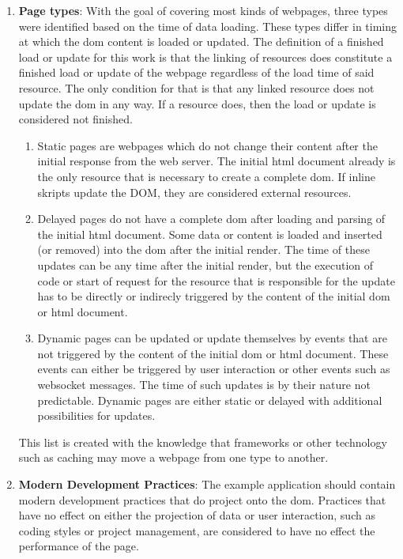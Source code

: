 \documentclass[a4paper, 10pt]{article}
\begin{document}
\begin{enumerate}
  \item \textbf{Page types}: With the goal of covering most kinds of webpages, three types were identified based on the time of data loading.\label{enum:pagetypes}
  These types differ in timing at which the \acrshort{dom} content is loaded or updated.
  The definition of a finished load or update for this work is that the linking of resources does constitute a finished load or update of the webpage regardless of the load time of said resource.
  The only condition for that is that any linked resource does not update the \acrshort{dom} in any way.
  If a resource does, then the load or update is considered not finished.
  \begin{enumerate}
    \item Static pages are webpages which do not change their content after the initial response from the web server.
    The initial \acrshort{html} document already is the only resource that is necessary to create a complete \acrshort{dom}.
    If inline skripts update the DOM, they are considered external resources.
    \item Delayed pages do not have a complete \acrshort{dom} after loading and parsing of the initial \acrshort{html} document.
    Some data or content is loaded and inserted (or removed) into the \acrshort{dom} after the initial render.
    The time of these updates can be any time after the initial render, but the execution of code or start of request for the resource that is responsible for the update has to be directly or indirecly triggered by the content of the initial \acrshort{dom} or \acrshort{html} document.
    \item Dynamic pages can be updated or update themselves by events that are not triggered by the content of the initial \acrshort{dom} or \acrshort{html} document.
    These events can either be triggered by user interaction or other events such as websocket messages.
    The time of such updates is by their nature not predictable.
    Dynamic pages are either static or delayed with additional possibilities for updates.
  \end{enumerate}
  This list is created with the knowledge that frameworks or other technology such as caching may move a webpage from one type to another.

  \item \textbf{Modern Development Practices}: The example application should contain modern development practices that do project onto the \acrshort{dom}.
  Practices that have no effect on either the projection of data or user interaction, such as coding styles or project management, are considered to have no effect the performance of the page.
  

\end{enumerate}
\end{document}
